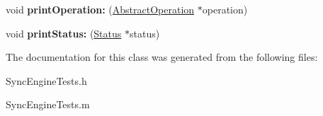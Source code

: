 \begin{DoxyCompactItemize}
\item 
\hypertarget{interface_sync_engine_tests_a1eb3704d50c11b22dd21790c147452f9}{
void {\bfseries print\-Operation\-:} (\hyperlink{interface_abstract_operation}{\-Abstract\-Operation} $\ast$operation)}
\label{interface_sync_engine_tests_a1eb3704d50c11b22dd21790c147452f9}

\item 
\hypertarget{interface_sync_engine_tests_ac2504b96f5d427b2aaa1010c9e56fe38}{
void {\bfseries print\-Status\-:} (\hyperlink{interface_status}{\-Status} $\ast$status)}
\label{interface_sync_engine_tests_ac2504b96f5d427b2aaa1010c9e56fe38}

\end{DoxyCompactItemize}


\-The documentation for this class was generated from the following files\-:\begin{DoxyCompactItemize}
\item 
\-Sync\-Engine\-Tests.\-h\item 
\-Sync\-Engine\-Tests.\-m\end{DoxyCompactItemize}

